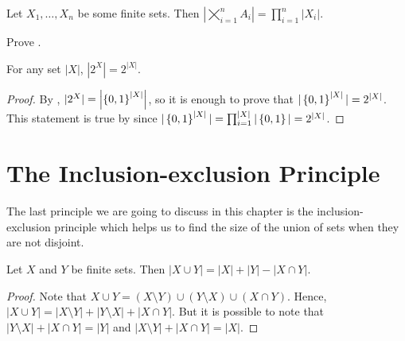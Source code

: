 \begin{corollary}
\label{corollary:multiplicative-principle}
  Let $X_1, \dots, X_n$ be some finite sets. Then
  $\left|\bigtimes_{i = 1}^n A_i\right| = \prod_{i = 1}^n |X_i|$.
\end{corollary}

\begin{exercise}
  Prove .
\end{exercise}

\begin{theorem}
\label{theorem:cardinality-of-power-set}
  For any set $|X|$, $|2^X| = 2^{|X|}$.
\end{theorem}
\begin{proof}
  By , $|2^X| =
  \left|\set{0, 1}^{|X|}\right|$, so it is enough to prove that
  $|\set{0, 1}^{|X|}| = 2^{|X|}$. This statement is true by
   since $|\set{0, 1}^{|X|}| =
  \prod_{i = 1}^{|X|} |\set{0, 1}| = 2^{|X|}$.
\end{proof}

\section{The Inclusion-exclusion Principle}

The last principle we are going to discuss in this chapter is the
inclusion-exclusion principle which helps us to find the size of the union
of sets when they are not disjoint.
\begin{theorem}
\label{theorem:inclusion-exclusion-principle}
  Let $X$ and $Y$ be finite sets. Then $|X \cup Y| = |X| + |Y| - |X \cap Y|$.
\end{theorem}
\begin{proof}
  Note that $X \cup Y = (X \setminus Y) \cup (Y \setminus X) \cup (X \cap Y)$.
  Hence, $|X \cup Y| = |X \setminus Y| + |Y \setminus X| + |X \cap Y|$. But it
  is possible to note that $|Y \setminus X| + |X \cap Y| = |Y|$ and
  $|X \setminus Y| + |X \cap Y| = |X|$.
\end{proof}

